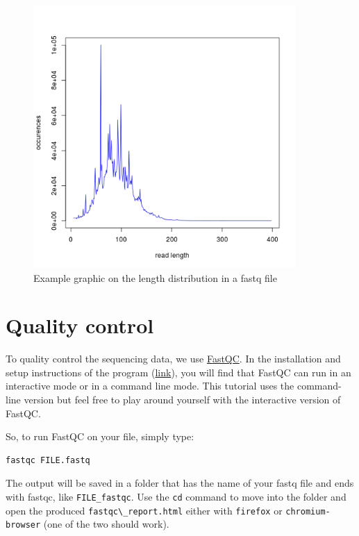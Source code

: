 \documentclass[11pt]{article}
\begin{document}
\begin{figure}[htb]
\centering
\includegraphics[width=10cm]{SequenceLengthDistribution.png}
\caption{Example graphic on the length distribution in a fastq file}
\end{figure}




\section{Quality control}
\label{sec-2}
To quality control the sequencing data, we use
\href{http://www.bioinformatics.babraham.ac.uk/projects/fastqc/}{FastQC}. In
the installation and setup instructions of the program
(\href{http://www.bioinformatics.babraham.ac.uk/projects/fastqc/INSTALL.txt}{link}),
you will find that FastQC can run in an interactive mode or in a
command line mode. This tutorial uses the command-line version but
feel free to play around yourself with the interactive version of
FastQC.

So, to run FastQC on your file, simply type:

\begin{verbatim}
fastqc FILE.fastq
\end{verbatim}

The output will be saved in a folder that has the name of your fastq
file and ends with fastqc, like \texttt{FILE\_fastqc}. Use the \texttt{cd} command to
move into the folder and open the produced \texttt{fastqc\textbackslash{}\_report.html} either
with \texttt{firefox} or \texttt{chromium-browser} (one of the two should work). 
\end{document}
